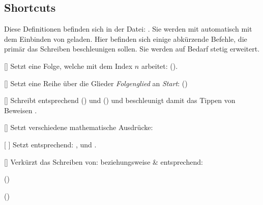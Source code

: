 \subsection[Shortcuts \LILLYxBOXxVersion{\small 1.0.8}]{Shortcuts}
Diese Definitionen befinden sich in der Datei: . Sie werden mit  automatisch mit dem Einbinden von  geladen.\medskip\newline
Hier befinden sich einige abkürzende Befehle, die primär das Schreiben beschleunigen sollen. Sie werden auf Bedarf stetig erweitert.

%
%
%

[]
Setzt eine Folge, welche mit dem Index $n$ arbeitet:  (\folge).

%
%
%

[]
Setzt eine Reihe über die Glieder \emph{Folgenglied} an \emph{Start}:  (\reihe)

%
%
%

[\cmdlist {}]
Schreibt entsprechend  () und  () und beschleunigt damit das Tippen von Beweisen \Smiley.

%
%
%

[\cmdlist {}\cmdlist {}\cmdlist {}\cmdlist {}]
Setzt verschiedene mathematische Ausdrücke:

%
%
%

[\cmdlist {}\cmdlist {} \cmdold]
Setzt entsprechend: \x[], \y und \z[].

%
%
%

[\cmdlist {}]
Verkürzt das Schreiben von:  beziehungsweise  \&  entsprechend:
\begin{multicols}{2}%
    \begin{ditemize}
        \item {} ()%
        \item {} ()%
    \end{ditemize}
\end{multicols}


